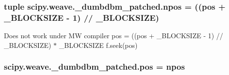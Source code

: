 \subsubsection[{npos}]{\setlength{\rightskip}{0pt plus 5cm}tuple scipy.\+weave.\+\_\+dumbdbm\+\_\+patched.\+npos = (({\bf pos} + {\bf \+\_\+\+B\+L\+O\+C\+K\+S\+I\+Z\+E} -\/ 1) // {\bf \+\_\+\+B\+L\+O\+C\+K\+S\+I\+Z\+E})}\label{namespacescipy_1_1weave_1_1__dumbdbm__patched_a3be926cb63ddd985ee8f94a294dbe98d}


Does not work under M\+W compiler pos = ((pos + \+\_\+\+B\+L\+O\+C\+K\+S\+I\+Z\+E -\/ 1) // \+\_\+\+B\+L\+O\+C\+K\+S\+I\+Z\+E) $\ast$ \+\_\+\+B\+L\+O\+C\+K\+S\+I\+Z\+E f.\+seek(pos) 

\hypertarget{namespacescipy_1_1weave_1_1__dumbdbm__patched_a67002c7d55ca53b9ff040655dea874ab}{}
\subsubsection[{pos}]{\setlength{\rightskip}{0pt plus 5cm}scipy.\+weave.\+\_\+dumbdbm\+\_\+patched.\+pos = {\bf npos}}\label{namespacescipy_1_1weave_1_1__dumbdbm__patched_a67002c7d55ca53b9ff040655dea874ab}
